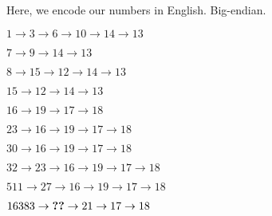 \documentclass{puzz}
\begin{document}

\begin{center}
Here, we encode our numbers in English. Big-endian.
\end{center}

$1 \to 3 \to 6 \to 10 \to 14 \to 13$

$7 \to 9 \to 14 \to 13$

$8 \to 15 \to 12 \to 14 \to 13$

$15 \to 12 \to 14 \to 13$

$16 \to 19 \to 17 \to 18$

$23 \to 16 \to 19 \to 17 \to 18$

$30 \to 16 \to 19 \to 17 \to 18$

$32 \to 23 \to 16 \to 19 \to 17 \to 18$

$511 \to 27 \to 16 \to 19 \to 17 \to 18$

$16383 \to \hbox{\bfseries ??} \to 21 \to 17 \to 18$
\end{document}
